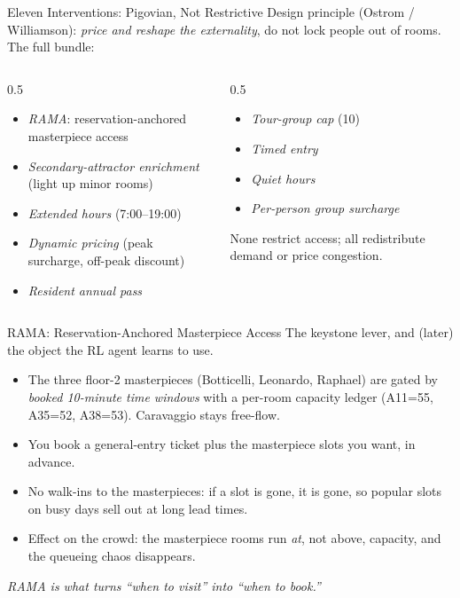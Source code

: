 \documentclass[aspectratio=169, 11pt]{beamer}
\newcommand{\emp}[1]{\textit{#1}}
\begin{document}
\begin{frame}{Eleven Interventions: Pigovian, Not Restrictive}
\footnotesize
Design principle (Ostrom / Williamson): \emp{price and reshape the externality}, do not
lock people out of rooms. The full bundle:
\vspace{0.3em}
\begin{columns}[T]
\begin{column}{0.5\textwidth}
\begin{itemize}\setlength\itemsep{1pt}
\item \emp{RAMA}: reservation-anchored masterpiece access
\item \emp{Secondary-attractor enrichment} (light up minor rooms)
\item \emp{Extended hours} (7:00--19:00)
\item \emp{Dynamic pricing} (peak surcharge, off-peak discount)
\item \emp{Resident annual pass}
\end{itemize}
\end{column}
\begin{column}{0.5\textwidth}
\begin{itemize}\setlength\itemsep{1pt}
\item \emp{Tour-group cap} (10)
\item \emp{Timed entry}
\item \emp{Quiet hours}
\item \emp{Per-person group surcharge}
\end{itemize}
\vspace{0.6em}
\footnotesize None restrict access; all redistribute demand or price congestion.
\end{column}
\end{columns}
\end{frame}

\begin{frame}{RAMA: Reservation-Anchored Masterpiece Access}
\footnotesize
The keystone lever, and (later) the object the RL agent learns to use.
\begin{itemize}\setlength\itemsep{2pt}
\item The three floor-2 masterpieces (Botticelli, Leonardo, Raphael) are gated by
      \emp{booked 10-minute time windows} with a per-room capacity ledger
      (A11{=}55, A35{=}52, A38{=}53). Caravaggio stays free-flow.
\item You book a general-entry ticket plus the masterpiece slots you want, in advance.
\item No walk-ins to the masterpieces: if a slot is gone, it is gone, so popular slots
      on busy days sell out at long lead times.
\item Effect on the crowd: the masterpiece rooms run \emp{at}, not above, capacity, and
      the queueing chaos disappears.
\end{itemize}
\vspace{0.3em}
\emp{RAMA is what turns ``when to visit'' into ``when to book.''}
\end{frame}
\end{document}

